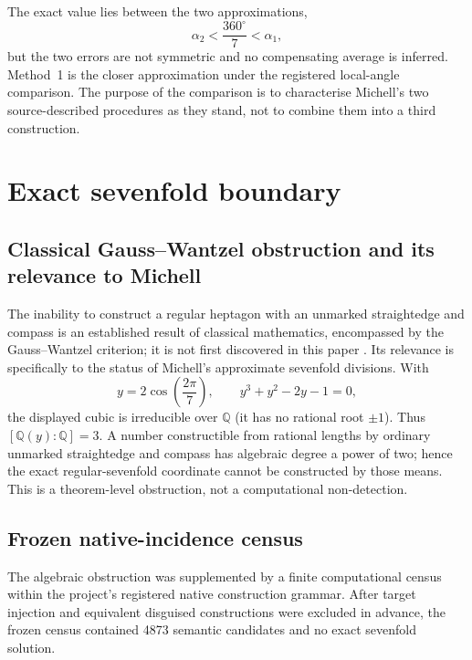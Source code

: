 \documentclass[11pt]{article}
\begin{document}
The exact value lies between the two approximations,
\[
\alpha_2<\frac{360^\circ}{7}<\alpha_1,
\]
but the two errors are not symmetric and no compensating average is inferred.
Method~1 is the closer approximation under the registered local-angle
comparison.  The purpose of the comparison is to characterise Michell's two
source-described procedures as they stand, not to combine them into a third
construction.


\section{Exact sevenfold boundary}

\subsection{Classical Gauss--Wantzel obstruction and its relevance to Michell}
The inability to construct a regular heptagon with an unmarked straightedge and compass is an established result of classical mathematics, encompassed by the Gauss--Wantzel criterion; it is not first discovered in this paper \citep{wantzel1837,mathworldHeptagon}. Its relevance is specifically to the status of Michell's approximate sevenfold divisions. With
\begin{equation}\label{eq:cubic}
 y=2\cos\left(\frac{2\pi}{7}\right),\qquad y^3+y^2-2y-1=0,
\end{equation}
the displayed cubic is irreducible over $\mathbb{Q}$ (it has no rational root $\pm 1$). Thus $[\mathbb{Q}(y):\mathbb{Q}]=3$. A number constructible from rational lengths by ordinary unmarked straightedge and compass has algebraic degree a power of two; hence the exact regular-sevenfold coordinate cannot be constructed by those means. This is a theorem-level obstruction, not a computational non-detection.

\subsection{Frozen native-incidence census}

The algebraic obstruction was supplemented by a finite computational census
within the project's registered native construction grammar.  After target
injection and equivalent disguised constructions were excluded in advance,
the frozen census contained 4873 semantic candidates and no exact sevenfold
solution.
\end{document}
